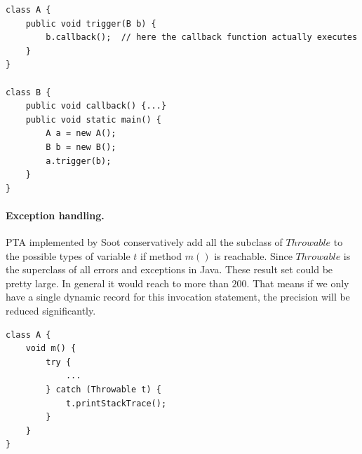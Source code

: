 \documentclass{fac}
\begin{document}
\begin{minipage}{\linewidth}
\vspace{10pt}
\begin{lstlisting}[caption={Callback mechanism},label={lst:callback}]
class A {
	public void trigger(B b) {
		b.callback();  // here the callback function actually executes
	}
}

class B {
	public void callback() {...}
	public void static main() {
		A a = new A();
		B b = new B();
		a.trigger(b);
 	}
}
\end{lstlisting}
\end{minipage}


\paragraph{Exception handling.} PTA implemented by Soot conservatively add all the subclass of $Throwable$ to the possible types of variable $t$ if method $m()$ is reachable. Since $Throwable$ is the superclass of all errors and exceptions in Java. These result set could be pretty large. In general it would reach to more than $200$. That means if we only have a single dynamic record for this invocation statement, the precision will be reduced significantly.

\begin{minipage}{\linewidth}
\vspace{10pt}
\begin{lstlisting}[caption={Java Exception},label={lst:exception}]
class A {
	void m() {
		try {
			...
		} catch (Throwable t) {
			t.printStackTrace();
		}
	}
}
\end{lstlisting}
\end{minipage}

\newcommand\commentout[1]{}
\end{document}
